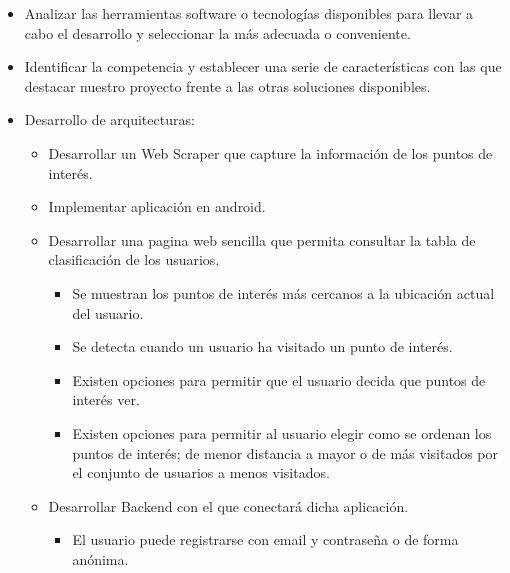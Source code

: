 \documentclass{report}
\begin{document}
\begin{itemize}

\item Analizar las herramientas software o tecnologías disponibles para llevar a cabo el desarrollo y seleccionar la más adecuada o conveniente.

\item Identificar la competencia y establecer una serie de características con las que destacar nuestro proyecto frente a las otras soluciones disponibles.

\item Desarrollo de arquitecturas:

    \begin{itemize}
    
    \item Desarrollar un Web Scraper que capture la información de los puntos de interés.
    
    \item Implementar aplicación en android.
    
    \item Desarrollar una pagina web sencilla que permita consultar la tabla de clasificación de los usuarios.
    
        \begin{itemize}
        
        \item Se muestran los puntos de interés más cercanos a la ubicación actual del usuario.
        
        \item Se detecta cuando un usuario ha visitado un punto de interés.
        
        \item Existen opciones para permitir que el usuario decida que puntos de interés ver.
        
        \item Existen opciones para permitir al usuario elegir como se ordenan los puntos de interés; de menor distancia a mayor o de más visitados por el conjunto de usuarios a menos visitados.
        
        \end{itemize}
    
    \item Desarrollar Backend con el que conectará dicha aplicación.
    
        \begin{itemize}
            
        \item El usuario puede registrarse con email y contraseña o de forma anónima.
        

\end{itemize}
\end{itemize}
\end{itemize}
\end{document}
